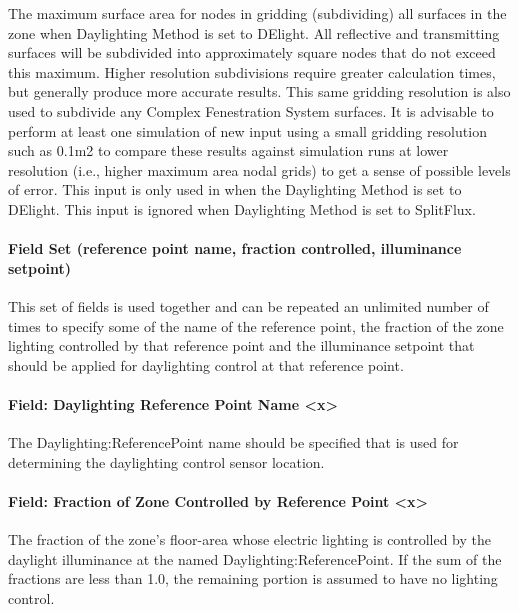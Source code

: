 The maximum surface area for nodes in gridding (subdividing) all surfaces in the zone when Daylighting Method is set to DElight. All reflective and transmitting surfaces will be subdivided into approximately square nodes that do not exceed this maximum. Higher resolution subdivisions require greater calculation times, but generally produce more accurate results. This same gridding resolution is also used to subdivide any Complex Fenestration System surfaces. It is advisable to perform at least one simulation of new input using a small gridding resolution such as 0.1m2 to compare these results against simulation runs at lower resolution (i.e., higher maximum area nodal grids) to get a sense of possible levels of error. This input is only used in when the Daylighting Method is set to DElight. This input is ignored when Daylighting Method is set to SplitFlux.

\paragraph{Field Set (reference point name, fraction controlled, illuminance setpoint)}\label{field-set-daylightingcontrols}

This set of fields is used together and can be repeated an unlimited number of times to specify some of the name of the reference point, the fraction of the zone lighting controlled by that reference point and the illuminance setpoint that should be applied for daylighting control at that reference point.

\paragraph{Field: Daylighting Reference Point Name <x>}\label{field-daylighting-reference-point-name-x}

The Daylighting:ReferencePoint name should be specified that is used for determining the daylighting control sensor location. 

\paragraph{Field: Fraction of Zone Controlled by Reference Point <x>}\label{field-fraction-of-zone-controlled-by-reference-point-x}

The fraction of the zone's floor-area whose electric lighting is controlled by the daylight illuminance at the named Daylighting:ReferencePoint. If the sum of the fractions are less than 1.0, the remaining portion is assumed to have no lighting control.

